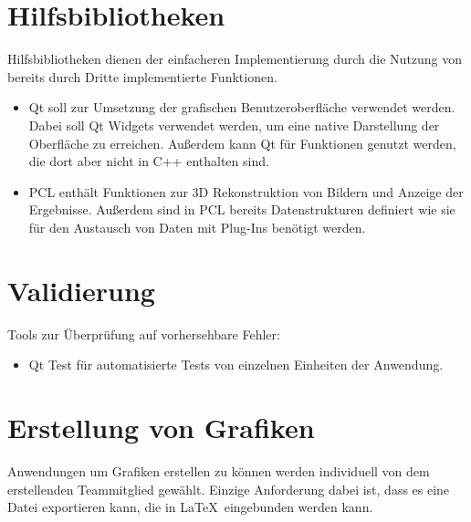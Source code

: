 \section{Hilfsbibliotheken}
	Hilfsbibliotheken dienen der einfacheren Implementierung durch die Nutzung von bereits durch Dritte implementierte Funktionen.
	\begin{itemize}
		\item Qt soll zur Umsetzung der grafischen Benutzeroberfläche verwendet werden. Dabei soll Qt Widgets verwendet werden, um eine native Darstellung der Oberfläche zu erreichen. Außerdem kann Qt für Funktionen genutzt werden, die dort aber nicht in C++ enthalten sind.
		\item PCL enthält Funktionen zur 3D Rekonstruktion von Bildern und Anzeige der Ergebnisse. Außerdem sind in PCL bereits Datenstrukturen definiert wie sie für den Austausch von Daten mit Plug-Ins benötigt werden.
	\end{itemize}
\section{Validierung}
	Tools zur Überprüfung auf vorhersehbare Fehler:
	\begin{itemize}
		\item Qt Test für automatisierte Tests von einzelnen Einheiten der Anwendung.
	\end{itemize}
\section{Erstellung von Grafiken}
	Anwendungen um Grafiken erstellen zu können werden individuell von dem erstellenden Teammitglied gewählt. Einzige Anforderung dabei ist, dass es eine Datei exportieren kann, die in \LaTeX\ eingebunden werden kann.

